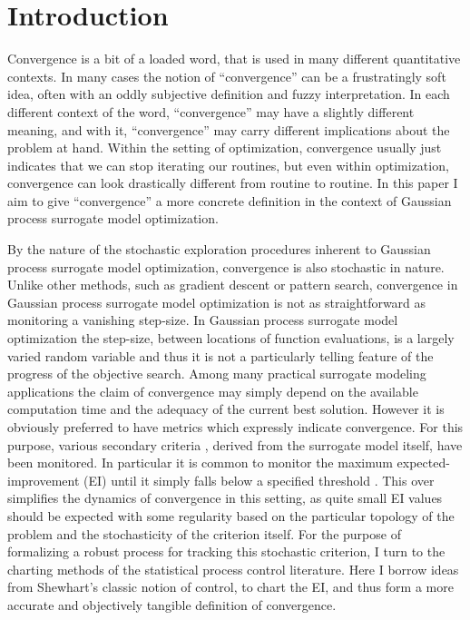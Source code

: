 \documentclass[12pt]{article}
\begin{document}
%
\section{Introduction}
	Convergence is a bit of a loaded word, that is used in many different quantitative contexts.
	In many cases the notion of ``convergence'' can be a frustratingly soft idea, often with an oddly subjective definition and fuzzy interpretation.  
	In each different context of the word, ``convergence'' may have a slightly different meaning, and with it, ``convergence'' may carry different implications about the problem at hand.
	Within the setting of optimization, convergence usually just indicates that we can stop iterating our routines, but even within optimization, convergence can look drastically different from routine to routine.
	In this paper I aim to give ``convergence'' a more concrete definition in the context of Gaussian process surrogate model optimization.
	
	
	By the nature of the stochastic exploration procedures inherent to Gaussian process surrogate model optimization, convergence is also stochastic in nature. 
	Unlike other methods, such as gradient descent or pattern search, convergence in Gaussian process surrogate model optimization is not as straightforward as monitoring a vanishing step-size.
	In Gaussian process surrogate model optimization the step-size, between locations of function evaluations, is a largely varied random variable and thus it is not a particularly telling feature of the progress of the objective search.
	Among many practical surrogate modeling applications the claim of convergence may simply depend on the available computation time and the adequacy of the current best solution.
	However it is obviously preferred to have metrics which expressly indicate convergence.
	For this purpose, various secondary criteria \cite{gramacy2014}, derived from the surrogate model itself, have been monitored.
	In particular it is common to monitor the maximum expected-improvement (EI) until it simply falls below a specified threshold \cite{windExample}.
	This over simplifies the dynamics of convergence in this setting, as quite small EI values should be expected with some regularity based on the particular topology of the problem and the stochasticity of the criterion itself. 
	For the purpose of formalizing a robust process for tracking this stochastic criterion, I turn to the charting methods of the statistical process control literature.
	Here I borrow ideas from Shewhart's \cite{shewhartBook} classic notion of control, to chart the EI, and thus form a more accurate and objectively tangible definition of convergence.  
\end{document}
